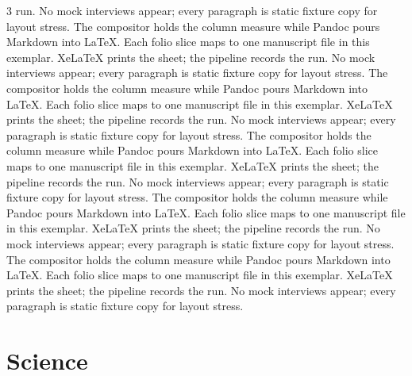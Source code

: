 \documentclass[
]{article}
\begin{document}
\begin{multicols}{3}
run. No mock interviews appear; every paragraph is static fixture copy
for layout stress. The compositor holds the column measure while Pandoc
pours Markdown into LaTeX. Each folio slice maps to one manuscript file
in this exemplar. XeLaTeX prints the sheet; the pipeline records the
run. No mock interviews appear; every paragraph is static fixture copy
for layout stress. The compositor holds the column measure while Pandoc
pours Markdown into LaTeX. Each folio slice maps to one manuscript file
in this exemplar. XeLaTeX prints the sheet; the pipeline records the
run. No mock interviews appear; every paragraph is static fixture copy
for layout stress. The compositor holds the column measure while Pandoc
pours Markdown into LaTeX. Each folio slice maps to one manuscript file
in this exemplar. XeLaTeX prints the sheet; the pipeline records the
run. No mock interviews appear; every paragraph is static fixture copy
for layout stress. The compositor holds the column measure while Pandoc
pours Markdown into LaTeX. Each folio slice maps to one manuscript file
in this exemplar. XeLaTeX prints the sheet; the pipeline records the
run. No mock interviews appear; every paragraph is static fixture copy
for layout stress. The compositor holds the column measure while Pandoc
pours Markdown into LaTeX. Each folio slice maps to one manuscript file
in this exemplar. XeLaTeX prints the sheet; the pipeline records the
run. No mock interviews appear; every paragraph is static fixture copy
for layout stress.

\end{multicols}

\newpage

\section{Science}\label{science}
\end{document}
